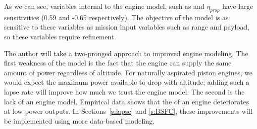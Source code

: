 \begin{footnotesize}
\end{footnotesize}

As we can see, variables internal to the engine model, such as \BSFC and $\eta_{prop}$ have
large sensitivities (0.59 and -0.65 respectively). The objective of the model
is as sensitive to these variables as mission input variables such as range and payload, so
these variables require refinement.


The author will take a two-pronged approach to improved engine modeling.
The first weakness of the model is the fact that the engine can supply the same amount of power
regardless of altitude. For naturally aspirated piston engines, we would expect the maximum power available to
drop with altitude; adding such a lapse rate will improve how much we trust the engine model.
The second is the lack of an engine \BSFC model. Empirical data shows that the
\BSFC of an engine deteriorates at low power outputs.
In Sections~\ref{s:lapse} and \ref{s:BSFC}, these improvements will be implemented using more data-based modeling.

